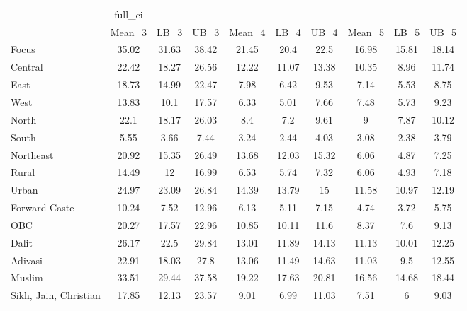 \begin{tabular}{l*{9}{c}}
\toprule
                    &     full\_ci&            &            &            &            &            &            &            &            \\
                    &      Mean\_3&        LB\_3&        UB\_3&      Mean\_4&        LB\_4&        UB\_4&      Mean\_5&        LB\_5&        UB\_5\\
\midrule
Focus               &       35.02&       31.63&       38.42&       21.45&        20.4&        22.5&       16.98&       15.81&       18.14\\
Central             &       22.42&       18.27&       26.56&       12.22&       11.07&       13.38&       10.35&        8.96&       11.74\\
East                &       18.73&       14.99&       22.47&        7.98&        6.42&        9.53&        7.14&        5.53&        8.75\\
West                &       13.83&        10.1&       17.57&        6.33&        5.01&        7.66&        7.48&        5.73&        9.23\\
North               &        22.1&       18.17&       26.03&         8.4&         7.2&        9.61&           9&        7.87&       10.12\\
South               &        5.55&        3.66&        7.44&        3.24&        2.44&        4.03&        3.08&        2.38&        3.79\\
Northeast           &       20.92&       15.35&       26.49&       13.68&       12.03&       15.32&        6.06&        4.87&        7.25\\
Rural               &       14.49&          12&       16.99&        6.53&        5.74&        7.32&        6.06&        4.93&        7.18\\
Urban               &       24.97&       23.09&       26.84&       14.39&       13.79&          15&       11.58&       10.97&       12.19\\
Forward Caste       &       10.24&        7.52&       12.96&        6.13&        5.11&        7.15&        4.74&        3.72&        5.75\\
OBC                 &       20.27&       17.57&       22.96&       10.85&       10.11&        11.6&        8.37&         7.6&        9.13\\
Dalit               &       26.17&        22.5&       29.84&       13.01&       11.89&       14.13&       11.13&       10.01&       12.25\\
Adivasi             &       22.91&       18.03&        27.8&       13.06&       11.49&       14.63&       11.03&         9.5&       12.55\\
Muslim              &       33.51&       29.44&       37.58&       19.22&       17.63&       20.81&       16.56&       14.68&       18.44\\
Sikh, Jain, Christian&       17.85&       12.13&       23.57&        9.01&        6.99&       11.03&        7.51&           6&        9.03\\
\bottomrule
\end{tabular}
